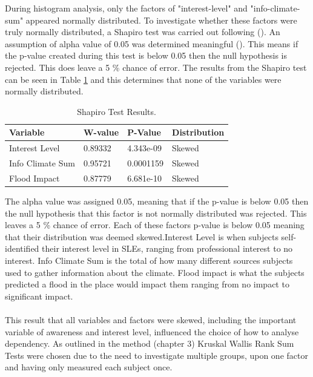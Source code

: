 During histogram analysis, only the factors of "interest-level" and "info-climate-sum" appeared normally distributed. To investigate whether these factors were truly normally distributed, a Shapiro test was carried out following (\cite{royston_extension_1982}).  An assumption of alpha value of 0.05 was determined meaningful (\cite{royston_extension_1982}). This means if the p-value created during this test is below 0.05 then the null hypothesis is rejected. This does leave a 5 \% chance of error. The results from the Shapiro test can be seen in Table \ref{table:shapiro_test_results} and this determines that none of the variables were normally distributed. 

\begin{table}[H]
    \centering
    \begin{tabular}{|l|l|l|l|}
    \hline
         \textbf{ Variable } &  \textbf{W-value}& \textbf{ P-Value}& \textbf{Distribution}\\ \hline
       Interest Level & 0.89332 & 4.343e-09 & Skewed \\ \hline
         Info Climate Sum  & 0.95721 & 0.0001159 & Skewed \\ \hline
        Flood Impact & 0.87779 & 6.681e-10 & Skewed \\ \hline
     \end{tabular}
    \caption{Shapiro Test Results.} {The alpha value was assigned 0.05, meaning that if the p-value is below 0.05 then the null hypothesis that this factor is not normally distributed was rejected. This leaves a 5 \% chance of error. Each of these factors p-value is below 0.05 meaning that their distribution was deemed skewed.Interest Level is when subjects self-identified their interest level in SLEs, ranging from professional interest to no interest. Info Climate Sum is the total of how many different sources subjects used to gather information about the climate. Flood impact is what the subjects predicted a flood in the place would impact them ranging from no impact to significant impact. }
    \label{table:shapiro_test_results}
\end{table}
\paragraph{}

This result that all variables and factors were skewed, including the important variable of awareness and interest level, influenced the choice of how to analyse dependency. As outlined in the method (chapter 3) Kruskal Wallis Rank Sum Tests were chosen due to the need to investigate multiple groups, upon one factor and having only measured each subject once.


